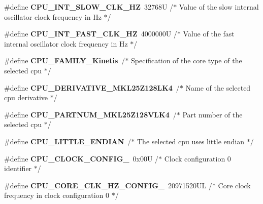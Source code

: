 \begin{DoxyCompactItemize}
\item 
\mbox{\label{group___cpu__module_ga925e4835a9fdb52f03bd354d62d6ba0a}} 
\#define {\bfseries C\+P\+U\+\_\+\+I\+N\+T\+\_\+\+S\+L\+O\+W\+\_\+\+C\+L\+K\+\_\+\+HZ}~32768\+U /$\ast$ Value of the slow internal oscillator clock frequency in Hz  $\ast$/
\item 
\mbox{\label{group___cpu__module_ga741ad9275688de8051f4bebd98a682bc}} 
\#define {\bfseries C\+P\+U\+\_\+\+I\+N\+T\+\_\+\+F\+A\+S\+T\+\_\+\+C\+L\+K\+\_\+\+HZ}~4000000\+U /$\ast$ Value of the fast internal oscillator clock frequency in Hz  $\ast$/
\item 
\mbox{\label{group___cpu__module_ga5bf3022570d9bb7a0d666f2dd9db6a34}} 
\#define {\bfseries C\+P\+U\+\_\+\+F\+A\+M\+I\+L\+Y\+\_\+\+Kinetis}~/$\ast$ Specification of the core type of the selected cpu $\ast$/
\item 
\mbox{\label{group___cpu__module_ga2a3e9dd6039080eb14febb4170e28908}} 
\#define {\bfseries C\+P\+U\+\_\+\+D\+E\+R\+I\+V\+A\+T\+I\+V\+E\+\_\+\+M\+K\+L25\+Z128\+L\+K4}~/$\ast$ Name of the selected cpu derivative $\ast$/
\item 
\mbox{\label{group___cpu__module_gac7935d3a36bc77e04bc16409e9ecdec3}} 
\#define {\bfseries C\+P\+U\+\_\+\+P\+A\+R\+T\+N\+U\+M\+\_\+\+M\+K\+L25\+Z128\+V\+L\+K4}~/$\ast$ Part number of the selected cpu $\ast$/
\item 
\mbox{\label{group___cpu__module_gab62ca27d0a6a531f35842a6e3a94b454}} 
\#define {\bfseries C\+P\+U\+\_\+\+L\+I\+T\+T\+L\+E\+\_\+\+E\+N\+D\+I\+AN}~/$\ast$ The selected cpu uses little endian $\ast$/
\item 
\mbox{\label{group___cpu__module_ga4d7ade6a1c335a7e5233938aa9197157}} 
\#define {\bfseries C\+P\+U\+\_\+\+C\+L\+O\+C\+K\+\_\+\+C\+O\+N\+F\+I\+G\+\_}~0x00\+U /$\ast$ Clock configuration 0 identifier $\ast$/
\item 
\mbox{\label{group___cpu__module_ga6fe0b841d40421ee48af4a4e01e48ddf}} 
\#define {\bfseries C\+P\+U\+\_\+\+C\+O\+R\+E\+\_\+\+C\+L\+K\+\_\+\+H\+Z\+\_\+\+C\+O\+N\+F\+I\+G\+\_}~20971520\+U\+L /$\ast$ Core clock frequency in clock configuration 0 $\ast$/

\end{DoxyCompactItemize}
